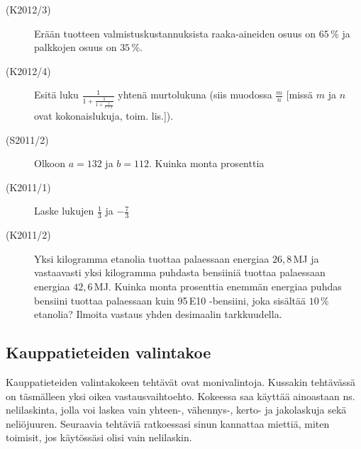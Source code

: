 \begin{description}
	\item[(K2012/3)] Erään tuotteen valmistuskustannuksista raaka-aineiden osuus on $65$\,\% ja palkkojen osuus on $35$\,\%.

	\item[(K2012/4)] Esitä luku $\frac{1}{1+\frac{1}{1+\frac{1}{1+1}}}$ yhtenä murtolukuna (siis muodossa $\frac{m}{n}$ [missä $m$ ja $n$ ovat kokonaislukuja, toim. lis.]).
	\item[(S2011/2)] Olkoon $a=132$ ja  $b=112$. Kuinka monta prosenttia 
	\item[(K2011/1)] Laske lukujen $\frac{1}{3}$ ja $-\frac{7}{3}$
	\item[(K2011/2)] Yksi kilogramma etanolia tuottaa palaessaan energiaa $26,8$\,MJ ja vastaavasti yksi kilogramma puhdasta bensiiniä tuottaa palaessaan energiaa $42,6$\,MJ. Kuinka monta prosenttia enemmän energiaa puhdas bensiini tuottaa palaessaan kuin 95\,E10 -bensiini, joka sisältää $10$\,\% etanolia? Ilmoita vastaus yhden desimaalin tarkkuudella. 
\end{description}

\subsection*{Kauppatieteiden valintakoe}

Kauppatieteiden valintakokeen tehtävät ovat monivalintoja. Kussakin tehtävässä on täsmälleen yksi oikea vastausvaihtoehto. Kokeessa saa käyttää ainoastaan ns. nelilaskinta, jolla voi laskea vain yhteen-, vähennys-, kerto- ja jakolaskuja sekä neliöjuuren. Seuraavia tehtäviä ratkoessasi sinun kannattaa miettiä, miten toimisit, jos käytössäsi olisi vain nelilaskin.

